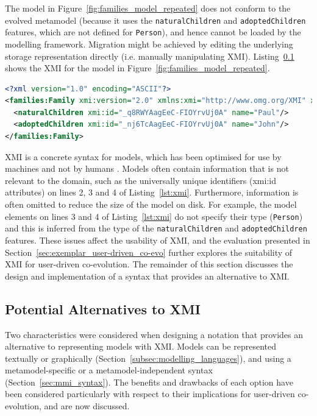 The model in Figure~\ref{fig:families_model_repeated} does not conform to the evolved metamodel (because it uses the \texttt{na\-tu\-ralCh\-il\-dr\-en} and \texttt{ad\-op\-t\-edCh\-il\-dr\-en} features, which are not defined for \texttt{Pe\-rs\-on}), and hence cannot be loaded by the modelling framework. Migration might be achieved by editing the underlying storage representation directly (i.e. manually manipulating XMI). Listing~\ref{} shows the XMI for the model in Figure~\ref{fig:families_model_repeated}.

\begin{lstlisting}[caption=XMI for the family model in Figure~\ref{fig:families_model_repeated}, label=lst:xmi, language=XML]
<?xml version="1.0" encoding="ASCII"?>
<families:Family xmi:version="2.0" xmlns:xmi="http://www.omg.org/XMI" xmlns:families="families" xmi:id="_kE2LkAagEeC-FIOYrvUj0A" name="Smiths">
  <naturalChildren xmi:id="_q8RWYAagEeC-FIOYrvUj0A" name="Paul"/>
  <adoptedChildren xmi:id="_nj6TcAagEeC-FIOYrvUj0A" name="John"/>
</families:Family>
\end{lstlisting}

XMI is a concrete syntax for models, which has been optimised for use by machines and not by humans \cite{hutn}. Models often contain information that is not relevant to the domain, such as the universally unique identifiers (xmi:id attributes) on lines 2, 3 and 4 of Listing~\ref{lst:xmi}. Furthermore, information is often omitted to reduce the size of the model on disk. For example, the model elements on lines 3 and 4 of Listing~\ref{lst:xmi} do not specify their type (\texttt{Pe\-rs\-on}) and this is inferred from the type of the \texttt{na\-tu\-ralCh\-il\-dr\-en} and \texttt{ad\-op\-t\-edCh\-il\-dr\-en} features. These issues affect the usability of XMI, and the evaluation presented in Section~\ref{sec:exemplar_user-driven_co-evo} further explores the suitability of XMI for user-driven co-evolution. The remainder of this section discusses the design and implementation of a syntax that provides an alternative to XMI.

\subsection{Potential Alternatives to XMI}
Two characteristics were considered when designing a notation that provides an alternative to representing models with XMI. Models can be represented textually or graphically (Section~\ref{subsec:modelling_languages}), and using a metamodel-specific or a metamodel-independent syntax (Section~\ref{sec:mmi_syntax}). The benefits and drawbacks of each option have been considered particularly with respect to their implications for user-driven co-evolution, and are now discussed.

